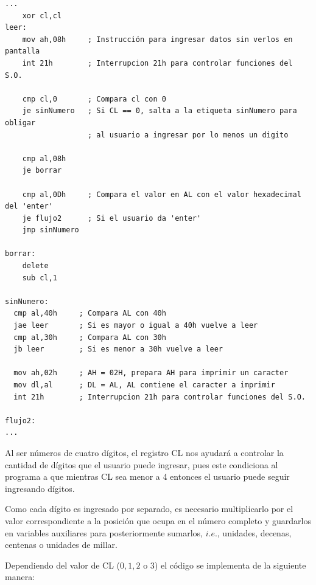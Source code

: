 \documentclass[letter,12 pt,titlepage]{article}
\begin{document}
    \begin{verbatim}
...
    xor cl,cl
leer:
    mov ah,08h     ; Instrucción para ingresar datos sin verlos en pantalla
    int 21h        ; Interrupcion 21h para controlar funciones del S.O.

    cmp cl,0       ; Compara cl con 0
    je sinNumero   ; Si CL == 0, salta a la etiqueta sinNumero para obligar  
                   ; al usuario a ingresar por lo menos un digito

    cmp al,08h
    je borrar

    cmp al,0Dh     ; Compara el valor en AL con el valor hexadecimal del 'enter'
    je flujo2      ; Si el usuario da 'enter'
    jmp sinNumero

borrar:
    delete
    sub cl,1

sinNumero:
  cmp al,40h     ; Compara AL con 40h
  jae leer       ; Si es mayor o igual a 40h vuelve a leer
  cmp al,30h     ; Compara AL con 30h
  jb leer        ; Si es menor a 30h vuelve a leer

  mov ah,02h     ; AH = 02H, prepara AH para imprimir un caracter
  mov dl,al      ; DL = AL, AL contiene el caracter a imprimir
  int 21h        ; Interrupcion 21h para controlar funciones del S.O.

flujo2:
...
    \end{verbatim}

    Al ser números de cuatro dígitos, el registro CL nos ayudará a controlar la cantidad de dígitos que el usuario puede ingresar, pues este condiciona al programa a que mientras CL sea menor a 4 entonces el usuario puede seguir ingresando dígitos.

    Como cada dígito es ingresado por separado, es necesario multiplicarlo por el valor correspondiente a la posición que ocupa en el número completo y guardarlos en variables auxiliares para posteriormente sumarlos, $i.e.$, unidades, decenas, centenas o unidades de millar.

    Dependiendo del valor de CL ($0, 1, 2$ o $3$) el código se implementa de la siguiente manera:
\end{document}
